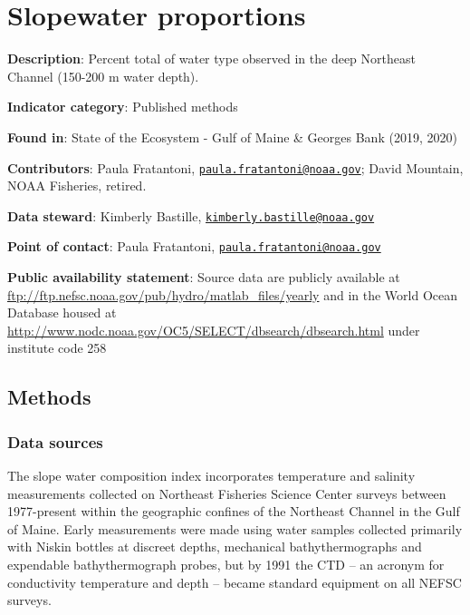 \documentclass[
]{book}
\begin{document}
\hypertarget{slopewater-proportions}{%
\chapter{Slopewater proportions}\label{slopewater-proportions}}

\textbf{Description}: Percent total of water type observed in the deep Northeast Channel (150-200 m water depth).

\textbf{Indicator category}: Published methods

\textbf{Found in}: State of the Ecosystem - Gulf of Maine \& Georges Bank (2019, 2020)

\textbf{Contributors}: Paula Fratantoni, \href{mailto:paula.fratantoni@noaa.gov}{\nolinkurl{paula.fratantoni@noaa.gov}}; David Mountain, NOAA Fisheries, retired.

\textbf{Data steward}: Kimberly Bastille, \href{mailto:kimberly.bastille@noaa.gov}{\nolinkurl{kimberly.bastille@noaa.gov}}

\textbf{Point of contact}: Paula Fratantoni, \href{mailto:paula.fratantoni@noaa.gov}{\nolinkurl{paula.fratantoni@noaa.gov}}

\textbf{Public availability statement}: Source data are publicly available at \url{ftp://ftp.nefsc.noaa.gov/pub/hydro/matlab_files/yearly} and in the World Ocean Database housed at \url{http://www.nodc.noaa.gov/OC5/SELECT/dbsearch/dbsearch.html} under institute code 258

\hypertarget{methods-37}{%
\section{Methods}\label{methods-37}}

\hypertarget{data-sources-37}{%
\subsection{Data sources}\label{data-sources-37}}

The slope water composition index incorporates temperature and salinity measurements collected on Northeast Fisheries Science Center surveys between 1977-present within the geographic confines of the Northeast Channel in the Gulf of Maine. Early measurements were made using water samples collected primarily with Niskin bottles at discreet depths, mechanical bathythermographs and expendable bathythermograph probes, but by 1991 the CTD -- an acronym for conductivity temperature and depth -- became standard equipment on all NEFSC surveys.
\end{document}
